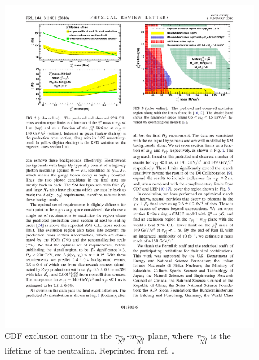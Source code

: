 \documentclass[dissertation.tex]{subfiles}
\begin{document}
\begin{figure}
	\centering
	\includegraphics[scale=1.0]{CDF_lifetime_vs_mass}
	\caption{CDF exclusion contour in the $\tau_{\widetilde{\chi}_{1}^{0}}$-$m_{\widetilde{\chi}_{1}^{0}}$ plane, where $\tau_{\widetilde{\chi}_{1}^{0}}$ is the lifetime of the neutralino.  Reprinted from ref. \cite{PhysRevLett.104.011801}.}
	\label{fig:CDF_lifetime_vs_mass}
\end{figure}
\end{document}
